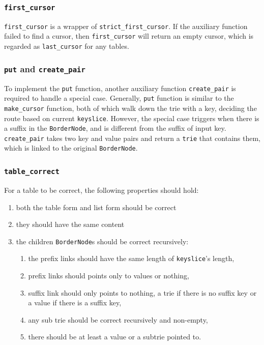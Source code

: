 \documentclass[runningheads]{llncs}
\begin{document}
\subsubsection{\texttt{first\_cursor}}

\texttt{first\_cursor} is a wrapper of \texttt{strict\_first\_cursor}. If the
auxiliary function failed to find a cursor, then \texttt{first\_cursor} will
return an empty cursor, which is regarded as \texttt{last\_cursor} for any
tables.  

\subsubsection{\texttt{put} and \texttt{create\_pair}}

To implement the \texttt{put} function, another auxiliary function
\texttt{create\_pair} is required to handle a special case. Generally,
\texttt{put} function is similar to the \texttt{make\_cursor} function, both of
which walk down the trie with a key, deciding the route based on current
\texttt{keyslice}. However, the special case triggers when there is a suffix in
the \texttt{BorderNode}, and is different from the suffix of input key.
\texttt{create\_pair} takes two key and value pairs and return a \texttt{trie}
that contains them, which is linked to the original \texttt{BorderNode}.

\subsubsection{\texttt{table\_correct}}

For a table to be correct, the following properties should hold:

\begin{enumerate}
\item both the table form and list form should be correct
\item they should have the same content
\item the children \texttt{BorderNode}s should be correct recursively:
  \begin{enumerate}
  \item the prefix links should have the same length of \texttt{keyslice}'s
    length,
  \item prefix links should points only to values or nothing,
  \item suffix link should only points to nothing, a trie if there is no suffix
    key or a value if there is a suffix key,
  \item any sub trie should be correct recursively and non-empty,
  \item there should be at least a value or a subtrie pointed to.
  \end{enumerate}
\end{enumerate}
\end{document}
